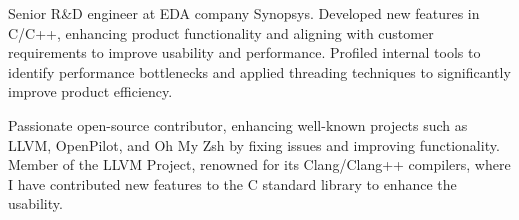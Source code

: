 

\begin{cvparagraph}

Senior R\&D engineer at EDA company Synopsys. Developed new features in C/C++, enhancing product functionality and aligning with customer requirements to improve usability and performance. Profiled internal tools to identify performance bottlenecks and applied threading techniques to significantly improve product efficiency.

Passionate open-source contributor, enhancing well-known projects such as LLVM, OpenPilot, and Oh My Zsh by fixing issues and improving functionality. Member of the LLVM Project, renowned for its Clang/Clang++ compilers, where I have contributed new features to the C standard library to enhance the usability.
\end{cvparagraph}
